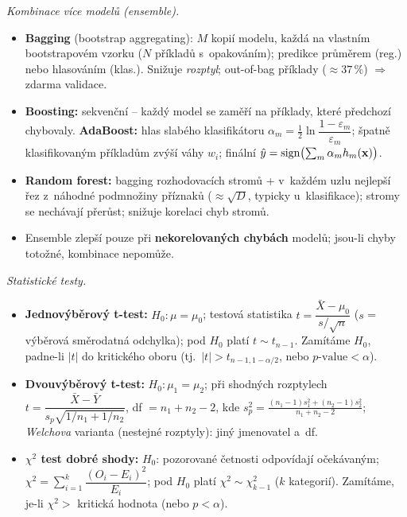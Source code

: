 \begin{poznamka}
\smallskip
\emph{Kombinace více modelů (ensemble).}
\begin{itemize}
  \item \textbf{Bagging} (bootstrap aggregating): $M$ kopií modelu, každá na vlastním bootstrapovém vzorku ($N$ příkladů s~opakováním); predikce průměrem (reg.) nebo hlasováním (klas.). Snižuje \emph{rozptyl}; out-of-bag příklady ($\approx37\,\%$) $\Rightarrow$ zdarma validace.
  \item \textbf{Boosting:} sekvenční -- každý model se zaměří na příklady, které předchozí chybovaly. \textbf{AdaBoost:} hlas slabého klasifikátoru $\alpha_m=\tfrac12\ln\dfrac{1-\varepsilon_m}{\varepsilon_m}$; špatně klasifikovaným příkladům zvýší váhy $w_i$; finální $\hat y=\operatorname{sign}\bigl(\sum_m\alpha_m h_m(\mathbf{x})\bigr)$.
  \item \textbf{Random forest:} bagging rozhodovacích stromů + v~každém uzlu nejlepší řez z~náhodné podmnožiny příznaků ($\approx\!\sqrt{D}$, typicky u~klasifikace); stromy se nechávají přerůst; snižuje korelaci chyb stromů.
  \item Ensemble zlepší pouze při \textbf{nekorelovaných chybách} modelů; jsou-li chyby totožné, kombinace nepomůže.
\end{itemize}

\smallskip
\emph{Statistické testy.}
\begin{itemize}
  \item \textbf{Jednovýběrový t-test:} $H_0\colon\mu=\mu_0$; testová statistika $t=\dfrac{\bar X-\mu_0}{s/\sqrt{n}}$ ($s$ = výběrová směrodatná odchylka); pod $H_0$ platí $t\sim t_{n-1}$. Zamítáme $H_0$, padne-li $|t|$ do kritického oboru (tj.\ $|t|>t_{n-1,1-\alpha/2}$, nebo $p\text{-value}<\alpha$).
  \item \textbf{Dvouvýběrový t-test:} $H_0\colon\mu_1=\mu_2$; při shodných rozptylech $t=\dfrac{\bar X-\bar Y}{s_p\sqrt{1/n_1+1/n_2}}$, df $= n_1+n_2-2$, kde $s_p^2=\frac{(n_1-1)s_1^2+(n_2-1)s_2^2}{n_1+n_2-2}$; \emph{Welchova} varianta (nestejné rozptyly): jiný jmenovatel a~df.
  \item \textbf{$\chi^2$ test dobré shody:} $H_0$: pozorované četnosti odpovídají očekávaným; $\chi^2=\sum_{i=1}^k\dfrac{(O_i-E_i)^2}{E_i}$; pod $H_0$ platí $\chi^2\sim\chi^2_{k-1}$ ($k$ kategorií). Zamítáme, je-li $\chi^2>$ kritická hodnota (nebo $p<\alpha$).
\end{itemize}


\end{poznamka}
